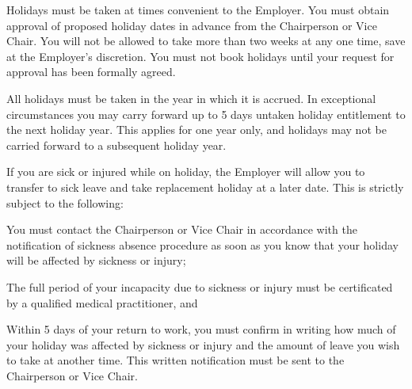 \documentclass[a4paper,11pt,onecolumn ]{article}
\begin{document}
\begin{legal}
\begin{legal}
\item Holidays must be taken at times convenient to the Employer. You must obtain
approval of proposed holiday dates in advance from the Chairperson or Vice
Chair. You will not be allowed to take more than two weeks at any one time,
save at the Employer’s discretion. You must not book holidays until your
request for approval has been formally agreed.
\item All holidays must be taken in the year in which it is accrued. In exceptional
circumstances you may carry forward up to 5 days untaken holiday entitlement
to the next holiday year. This applies for one year only, and holidays may not be
carried forward to a subsequent holiday year.
\item If you are sick or injured while on holiday, the Employer will allow you to
transfer to sick leave and take replacement holiday at a later date. This is
strictly subject to the following:
\begin{legal}
  \item You must contact the Chairperson or Vice Chair in accordance with the
  notification of sickness absence procedure as soon as you know that your
  holiday will be affected by sickness or injury;
  \item The full period of your incapacity due to sickness or injury must be
  certificated by a qualified medical practitioner, and
  \item Within 5 days of your return to work, you must confirm in writing how
  much of your holiday was affected by sickness or injury and the amount of
  leave you wish to take at another time. This written notification must be
  sent to the Chairperson or Vice Chair.
\end{legal}
\end{legal}

\item {}


\end{legal}
\end{document}
